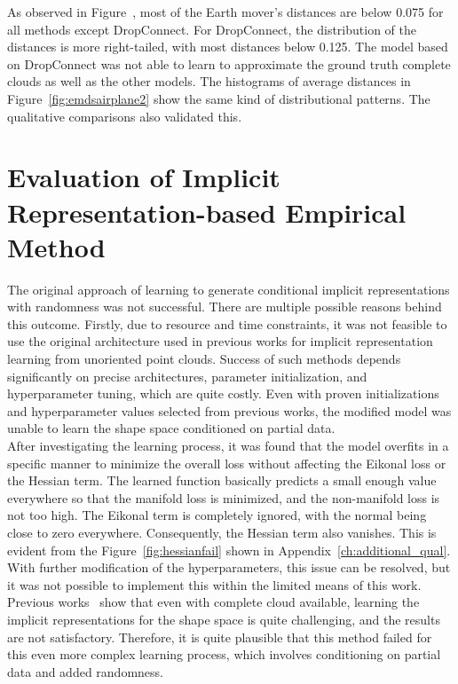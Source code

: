         As observed in Figure~\label{fig:emdsairplane1}, most of the Earth mover's distances are below 0.075 for all methods except DropConnect. For DropConnect, the distribution of the distances is more right-tailed, with most distances below 0.125. The model based on DropConnect was not able to learn to approximate the ground truth complete clouds as well as the other models. The histograms of average distances in Figure~\ref{fig:emdsairplane2} show the same kind of distributional patterns. The qualitative comparisons also validated this.


\section{Evaluation of Implicit Representation-based Empirical Method}
    The original approach of learning to generate conditional implicit representations with randomness was not successful. There are multiple possible reasons behind this outcome. Firstly, due to resource and time constraints, it was not feasible to use the original architecture used in previous works for implicit representation learning from unoriented point clouds. Success of such methods depends significantly on precise architectures, parameter initialization, and hyperparameter tuning, which are quite costly. Even with proven initializations and hyperparameter values selected from previous works, the modified model was unable to learn the shape space conditioned on partial data.
    \\
    After investigating the learning process, it was found that the model overfits in a specific manner to minimize the overall loss without affecting the Eikonal loss or the Hessian term. The learned function basically predicts a small enough value everywhere so that the manifold loss is minimized, and the non-manifold loss is not too high. The Eikonal term is completely ignored, with the normal being close to zero everywhere. Consequently, the Hessian term also vanishes. This is evident from the Figure~\ref{fig:hessianfail} shown in Appendix~\ref{ch:additional_qual}. With further modification of the hyperparameters, this issue can be resolved, but it was not possible to implement this within the limited means of this work. Previous works~\cite{DiGS, NeuralHessian} show that even with complete cloud available, learning the implicit representations for the shape space is quite challenging, and the results are not satisfactory. Therefore, it is quite plausible that this method failed for this even more complex learning process, which involves conditioning on partial data and added randomness. 
    
